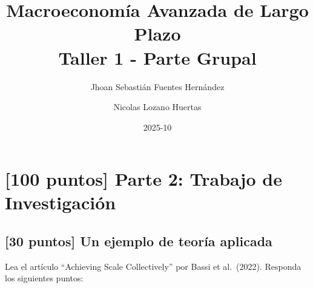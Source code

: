 \documentclass{article}
\title{\textbf{Macroeconom\'ia Avanzada de Largo Plazo} \\ \textbf{Taller 1 - Parte Grupal}}
\author{Jhoan Sebasti\'an Fuentes Hern\'andez \and Nicolas Lozano Huertas}
\date{2025-10}
\theoremstyle{remark}
\theoremstyle{definition}
\begin{document}
\maketitle
\vspace{-1 cm}

\section*{[100 puntos] Parte 2: Trabajo de Investigaci\'on}

\subsection{[30 puntos] Un ejemplo de teor\'ia aplicada}

Lea el art\'iculo ``Achieving Scale Collectively'' por Bassi et al.\ (2022). Responda los siguientes puntos:
\end{document}
